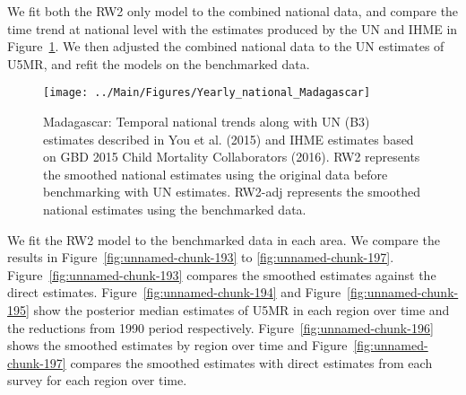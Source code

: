 \documentclass[12pt]{article}\usepackage[]{graphicx}\usepackage[]{color}
\newenvironment{knitrout}{}{} %
\begin{document}
We fit both the RW2 only model to the combined national data, and compare the time trend at national level with the estimates produced by the UN and IHME in Figure~\ref{fig:unnamed-chunk-192}. We then adjusted the combined national data to the UN estimates of U5MR, and refit the models on the benchmarked data. 

\begin{knitrout}
\color{fgcolor}\begin{figure}[bht]

{\centering \texttt{[image: ../Main/Figures/Yearly\_national\_Madagascar]} 

}

\caption[Madagascar]{Madagascar: Temporal national trends along with UN (B3) estimates described in You et al. (2015) and IHME estimates based on GBD 2015 Child Mortality Collaborators (2016). RW2 represents the smoothed national estimates using the original data before benchmarking with UN estimates. RW2-adj represents the smoothed national estimates using the benchmarked data.}\label{fig:unnamed-chunk-192}
\end{figure}


\end{knitrout}
 

We fit the RW2 model to the benchmarked data in each area. 
We compare the results in Figure~\ref{fig:unnamed-chunk-193} to \ref{fig:unnamed-chunk-197}.
Figure~\ref{fig:unnamed-chunk-193} compares the smoothed estimates against the direct estimates. Figure~\ref{fig:unnamed-chunk-194} and Figure~\ref{fig:unnamed-chunk-195} show the posterior median estimates of U5MR in each region over time and the reductions from 1990 period respectively.
Figure~\ref{fig:unnamed-chunk-196} shows the smoothed estimates by region over time and Figure~\ref{fig:unnamed-chunk-197} compares the smoothed estimates with direct estimates from each survey for each region over time.




\end{document}
